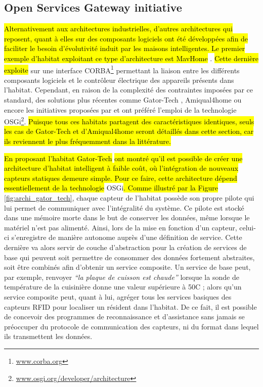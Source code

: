 \subsection{Open Services Gateway initiative}

\hl{Alternativement aux architectures industrielles, d'autres architectures qui reposent, quant à elles sur des composants logiciels ont été développées afin de faciliter le besoin d'évolutivité induit par les maisons intelligentes. Le premier exemple d'habitat exploitant ce type d'architecture est MavHome} \citep{DJCook2003}. \hl{Cette dernière exploite} sur une interface \ac{CORBA}\footnote{\url{www.corba.org}} permettant la liaison entre les différents composants logiciels et le contrôleur électrique des appareils présents dans l'habitat. Cependant, en raison de la complexité des contraintes imposées par ce standard, des solutions plus récentes comme Gator-Tech \citep{Helal2005}, Amiqual4home \citep{Lago2017} ou encore les initiatives proposées par \cite{Novak2011} et \cite{Cheng2012} ont préféré l'emploi de la technologie \ac{OSGi}\footnote{\url{www.osgi.org/developer/architecture}}. \hl{Puisque tous ces habitats partagent des caractéristiques identiques, seuls les cas de Gator-Tech et d'Amiqual4home seront détaillés dans cette section, car ils reviennent le plus fréquemment dans la littérature.}

\hl{En proposant l'habitat Gator-Tech} \cite{Helal2005} \hl{ont montré qu'il est possible de créer une architecture d'habitat intelligent à faible coût, où l'intégration de nouveaux capteurs statiques demeure simple. Pour ce faire, cette architecture dépend essentiellement de la technologie} \acs{OSGi}\hl{. Comme illustré par la Figure} \ref{fig:archi_gator_tech}, chaque capteur de l'habitat possède son propre pilote qui lui permet de communiquer avec l'intégralité du système. Ce pilote est stocké dans une mémoire morte dans le but de conserver les données, même lorsque le matériel n'est pas alimenté. Ainsi, lors de la mise en fonction d'un capteur, celui-ci s'enregistre de manière autonome auprès d'une définition de service. Cette dernière va alors servir de couche d'abstraction pour la création de services de base qui peuvent soit permettre de consommer des données fortement abstraites, soit être combinés afin d'obtenir un service composite. Un service de base peut, par exemple, renvoyer \textit{``la plaque de cuisson est chaude''} lorsque la sonde de température de la cuisinière donne une valeur supérieure à 50\textdegree{}C ; alors qu'un service composite peut, quant à lui, agréger tous les services basiques des capteurs \ac{RFID} pour localiser un résident dans l'habitat. De ce fait, il est possible de concevoir des programmes de reconnaissance et d'assistance sans jamais se préoccuper du protocole de communication des capteurs, ni du format dans lequel ils transmettent les données.


